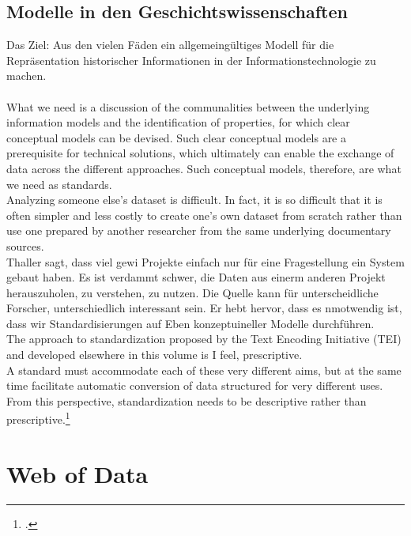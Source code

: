 \documentclass[12pt,a4paper]{article}
\begin{document}
\subsection{Modelle in den Geschichtswissenschaften}

Das Ziel: Aus den vielen Fäden ein allgemeingültiges Modell für die Repräsentation historischer Informationen in der Informationstechnologie zu machen.
\\
\\
What we need is a discussion of the communalities between the underlying information models and the identification of properties, for which clear conceptual models can be devised. Such clear conceptual models are a prerequisite for technical solutions, which ultimately can enable the exchange of data across the different approaches. Such conceptual models, therefore, are what we need as standards.
\\
Analyzing someone else’s dataset is difficult. In fact, it is so
difficult that it is often simpler and less costly to create one’s own dataset from
scratch rather than use one prepared by another researcher from the same underlying documentary sources.
\\
Thaller sagt, dass viel gewi Projekte einfach nur für eine Fragestellung ein System gebaut haben. Es ist verdammt schwer, die Daten aus einerm anderen Projekt herauszuholen, zu verstehen, zu nutzen. Die  Quelle kann für unterscheidliche Forscher, unterschiedlich interessant sein. Er hebt hervor, dass es nmotwendig ist, dass wir Standardisierungen auf Eben konzeptuineller Modelle durchführen. 
\\
The approach to
standardization proposed by the Text Encoding Initiative (TEI) and developed
elsewhere in this volume is I feel, prescriptive.
\\
A standard must accommodate each of these very different aims, but at the same time facilitate automatic
conversion of data structured for very different uses. From this perspective, standardization needs to be descriptive rather than prescriptive.\footcite[][S.204]{thaller2017need}

\section{Web of Data}
\end{document}
